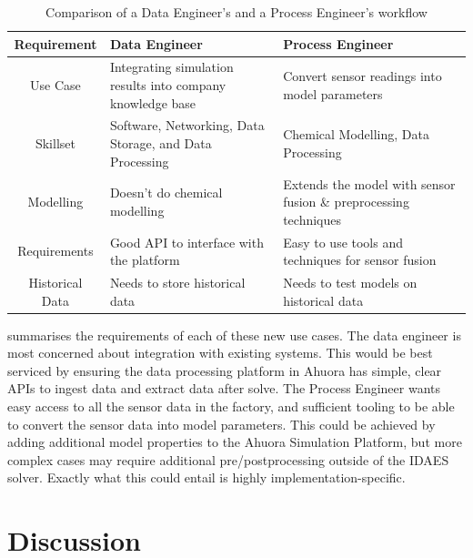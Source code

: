 \begin{table}[ht]
    \centering
    \caption{Comparison of a Data Engineer's and a Process Engineer's workflow}
    \begin{tabular}{|c|p{}|p{}|}
        \hline
        \textbf{Requirement} & \textbf{Data Engineer} & \textbf{Process Engineer} \\
        \hline
        Use Case & Integrating simulation results into company knowledge base & Convert sensor readings into model parameters \\
        \hline
        Skillset & Software, Networking, Data Storage, and Data Processing  & Chemical Modelling, Data Processing \\
        \hline
        Modelling & Doesn't do chemical modelling & Extends the model with sensor fusion \& preprocessing techniques\\
        \hline
        Requirements & Good API to interface with the platform & Easy to use tools and techniques for sensor fusion \\
        \hline
        Historical Data & Needs to store historical data & Needs to test models on historical data \\
        \hline
    \end{tabular}
    \label{tab:morerequirements}
\end{table}


 summarises the requirements of each of these new use cases. The data engineer is most concerned about integration with existing systems. This would be best serviced by ensuring the data processing platform in Ahuora has simple, clear APIs to ingest data and extract data after solve. The Process Engineer wants easy access to all the sensor data in the factory, and sufficient tooling to be able to convert the sensor data into model parameters. This could be achieved by adding additional model properties to the Ahuora Simulation Platform, but more complex cases may require additional pre/postprocessing outside of the IDAES solver. Exactly what this could entail is highly implementation-specific.

\section{Discussion}


